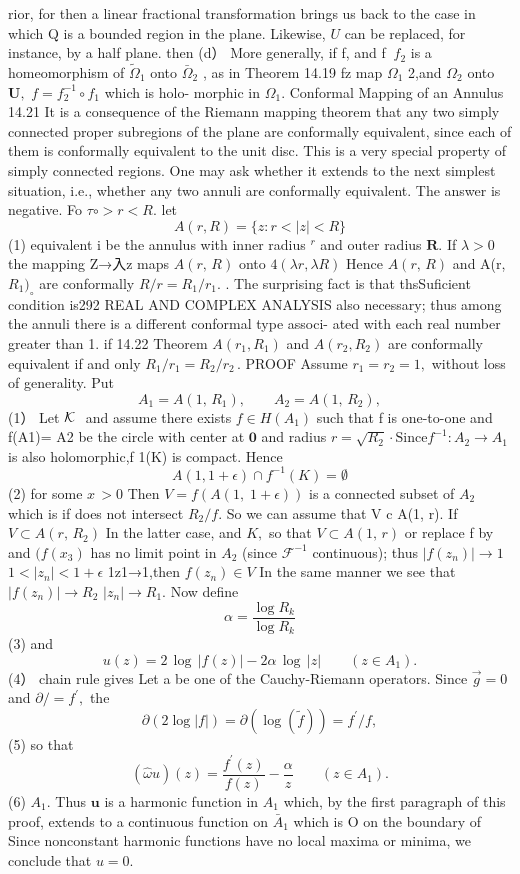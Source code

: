 rior, for then a linear fractional transformation brings us back to the case in which Q is a bounded region in the plane. Likewise, $U$ can be replaced, for instance, by a half plane. then (d） More generally, if f, and f $\ f_{2}$ is a homeomorphism of ${\tilde{\Omega}}_{1}$ onto ${\bar{\Omega}}_{2}$ , as in Theorem 14.19 fz map $\Omega_{1}$ 2,and $\Omega_{2}$ onto ${\boldsymbol{U}},$ $f=f_{2}^{-1}\circ f_{1}$ which is holo- morphic in $\Omega_{1}.$ Conformal Mapping of an Annulus 14.21 It is a consequence of the Riemann mapping theorem that any two simply connected proper subregions of the plane are conformally equivalent, since each of them is conformally equivalent to the unit disc. This is a very special property of simply connected regions. One may ask whether it extends to the next simplest situation, i.e., whether any two annuli are conformally equivalent. The answer is negative. Fo $\tau\circ>r<R.$ let $$ A(r,R)=\{z\colon r<|z|<R\} $$ (1) equivalent i be the annulus with inner radius ${}^{r}$ and outer radius ${\boldsymbol{R}}.$ If $\scriptstyle{\lambda>0}$ the mapping Z→入z maps $A(r,\,R)$ onto $4(\lambda r,\lambda R)$ Hence ${\mathit{A}}(r,\,R)$ and A(r, $R_{1})_{\circ}$ are conformally $R/r=R_{1}/r_{1}.$ . The surprising fact is that thsSuficient condition is292 REAL AND COMPLEX ANALYSIS also necessary; thus among the annuli there is a different conformal type associ- ated with each real number greater than 1. if 14.22 Theorem $A(r_{1},R_{1})$ and $A(r_{2},R_{2})$ are conformally equivalent if and only $R_{1}/r_{1}=R_{2}/r_{2}\,.$ PROOF Assume $r_{1}=r_{2}=1,$ without loss of generality. Put $$ A_{1}=A(1,\,R_{1}),\qquad A_{2}=A(1,\,R_{2}), $$ (1） Let ${\cal K}\,\,$ and assume there exists $f\in H(A_{1})$ such that f is one-to-one and f(A1)= A2 be the circle with center at ${\mathbf{0}}$ and radius $r={\sqrt{R_{2}}}\cdot\mathrm{Since}f^{-1}\!:A_{2}\!\to\!A_{1}$ is also holomorphic,f 1(K) is compact. Hence $$ A(1,1+\epsilon)\cap f^{-1}(K)=\emptyset $$ (2) for some $\scriptstyle x\,>0$ Then $V=f(A(1,\;1+\epsilon))$ is a connected subset of $A_{2}$ which is if does not intersect $R_{2}/f.$ So we can assume that V c A(1, r). If $V\subset A(r,\,R_{2})$ In the latter case, and $K,$ so that $V\subset A(1,\,r)$ or replace f by and $\scriptstyle(f(x_{3})$ has no limit point in $A_{2}$ (since ${\mathcal{F}}^{-1}$ continuous); thus $|f(z_{n})|\to1$ $1<\vert z_{n}\vert<1+\epsilon$ 1z1→1,then $f(z_{n})\in V$ In the same manner we see that $|f(z_{n})|\to R_{2}$ $|z_{n}|\to R_{1}.$ Now define $$ \alpha={\frac{\log R_{k}}{\log R_{k}}} $$ (3) and $$ u(z)=2\,\log\,|f(z)|-2\alpha\,\log\,|z|\qquad(z\in A_{1}). $$ (4） chain rule gives Let a be one of the Cauchy-Riemann operators. Since $\scriptstyle{\vec{g}}=0$ and $\partial\!\!\!/=f^{\prime},$ the $$ \partial(2\log\vert f\vert)=\partial(\log\left(\tilde{f}\right))=f^{\prime}/f, $$ (5) so that $$ (\hat{\omega}u)(z)=\frac{f^{\prime}(z)}{f(z)}-\frac{\alpha}{z}\;\;\;\;\;\;\;(z\in A_{1}). $$ (6) $A_{1}.$ Thus $\boldsymbol{u}$ is a harmonic function in $A_{1}$ which, by the first paragraph of this proof, extends to a continuous function on ${\bar{A}}_{1}$ which is O on the boundary of Since nonconstant harmonic functions have no local maxima or minima, we conclude that $u=0.$ 